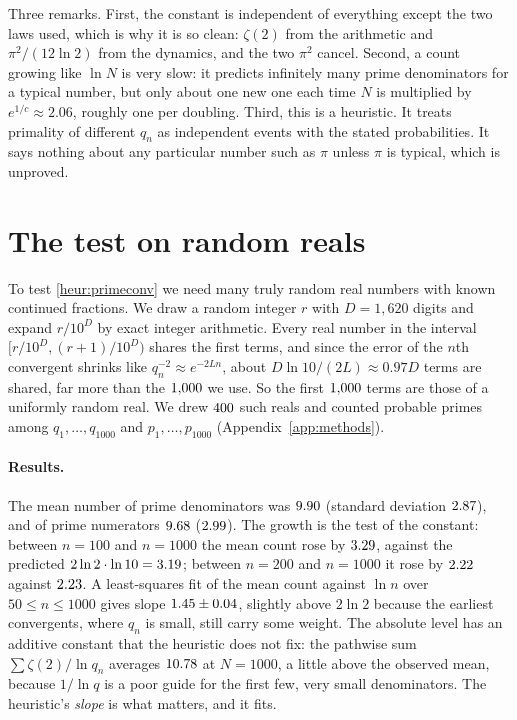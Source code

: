 Three remarks. First, the constant is independent of everything except the two laws used, which is why it is so clean: $\zeta(2)$ from the arithmetic and $\pi^2/(12\ln2)$ from the dynamics, and the two $\pi^2$ cancel. Second, a count growing like $\ln N$ is very slow: it predicts infinitely many prime denominators for a typical number, but only about one new one each time $N$ is multiplied by $e^{1/c} \approx 2.06$, roughly one per doubling. Third, this is a heuristic. It treats primality of different $q_n$ as independent events with the stated probabilities. It says nothing about any particular number such as $\pi$ unless $\pi$ is typical, which is unproved.

\section{The test on random reals}

To test \cref{heur:primeconv} we need many truly random real numbers with known continued fractions. We draw a random integer $r$ with $D = 1{,}620$ digits and expand $r/10^D$ by exact integer arithmetic. Every real number in the interval $[r/10^D, (r+1)/10^D)$ shares the first terms, and since the error of the $n$th convergent shrinks like $q_n^{-2} \approx e^{-2Ln}$, about $D\ln 10/(2L) \approx 0.97D$ terms are shared, far more than the $1{,}000$ we use. So the first $1{,}000$ terms are those of a uniformly random real. We drew $400$ such reals and counted probable primes among $q_1, \dots, q_{1000}$ and $p_1, \dots, p_{1000}$ (Appendix~\ref{app:methods}).

\paragraph{Results.} The mean number of prime denominators was $9.90$ (standard deviation $2.87$), and of prime numerators $9.68$ ($2.99$). The growth is the test of the constant: between $n = 100$ and $n = 1000$ the mean count rose by $3.29$, against the predicted $2 \ln 2 \cdot \ln 10 = 3.19$; between $n = 200$ and $n = 1000$ it rose by $2.22$ against $2.23$. A least-squares fit of the mean count against $\ln n$ over $50 \le n \le 1000$ gives slope $1.45 \pm 0.04$, slightly above $2\ln 2$ because the earliest convergents, where $q_n$ is small, still carry some weight. The absolute level has an additive constant that the heuristic does not fix: the pathwise sum $\sum \zeta(2)/\ln q_n$ averages $10.78$ at $N = 1000$, a little above the observed mean, because $1/\ln q$ is a poor guide for the first few, very small denominators. The heuristic's \emph{slope} is what matters, and it fits.

